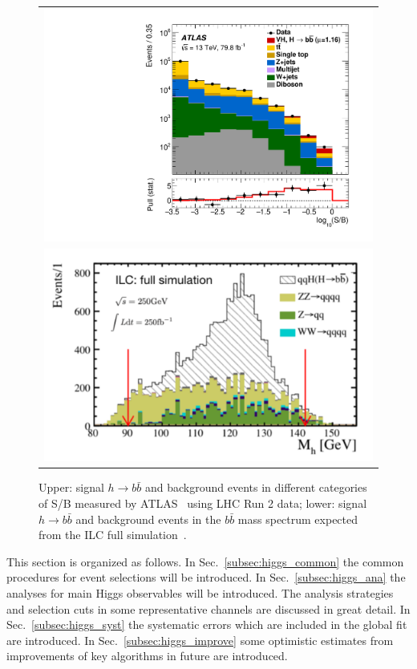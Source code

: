 \begin{figure}
\begin{tabular}[c]{c}
\includegraphics[width=0.85\hsize]{chapters/figures/ATLAS_VH_bb.pdf} \\
\includegraphics[width=0.85\hsize]{chapters/figures/qqH_bb250_ILC.pdf}
\end{tabular}
  \caption{Upper: signal $h\to b\bar{b}$ and background events in different categories of S/B
  measured by ATLAS~\cite{Aaboud:2018zhk,Sirunyan:2018kst} using LHC Run 2 data; lower: signal $h\to b\bar{b}$ 
  and background events in the $b\bar{b}$ mass spectrum expected from the 
  ILC full simulation~\cite{Ogawa:2018}.}
  \label{fig:LHCILCHbb}
\end{figure}

This section is organized as follows. In Sec.~\ref{subsec:higgs_common} the common
procedures for event selections will be introduced. In Sec.~\ref{subsec:higgs_ana} the 
analyses for main Higgs observables will be introduced. The analysis strategies and 
selection cuts in some representative channels are discussed in great detail. 
In Sec.~\ref{subsec:higgs_syst} the systematic errors which are included in 
the global fit are introduced. In Sec.~\ref{subsec:higgs_improve} some optimistic estimates
from improvements of key algorithms in future are introduced.